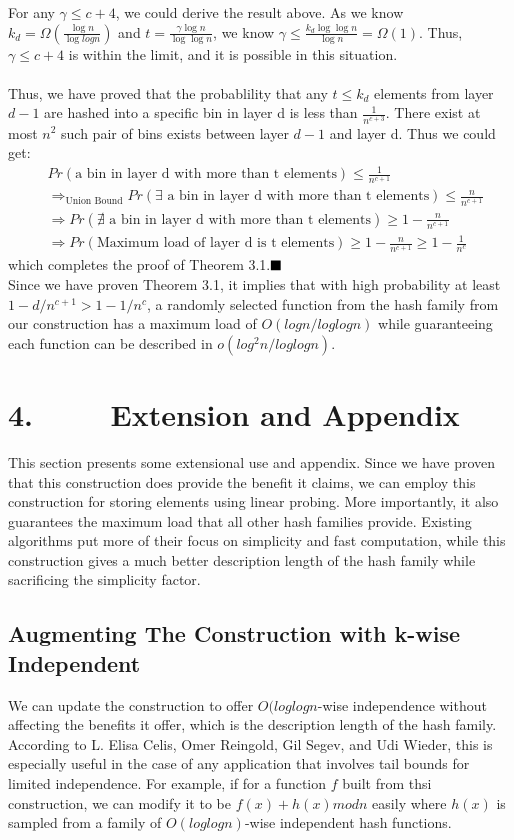 \documentclass[a4paper, english]{paper}
\begin{document}
For any $\gamma\le c+4$, we could derive the result above. As we know $k_d = \Omega(\frac{\log n}{\log log n})$ and $t = \frac{\gamma\log n}{\log\log n}$, we know $\gamma\le \frac{k_d\log\log n}{\log n} = \Omega(1)$. Thus, $\gamma\le c+4$ is within the limit, and it is possible in this situation.\\\\
Thus, we have proved that the probablility that any $t\le k_d$ elements from layer $d-1$ are hashed into a specific bin in layer d is less than $\frac{1}{n^{c+3}}$. There exist at most $n^2$ such pair of bins exists between layer $d-1$ and layer d. Thus we could get:
\begin{align*}
&Pr(\text{a bin in layer d with more than t elements})\le\frac1{n^{c+1}}\\
&\Rightarrow_{\text{Union Bound}} Pr(\exists\text{ a bin in layer d with more than t elements})\le\frac n{n^{c+1}}\\
&\Rightarrow Pr(\nexists\text{ a bin in layer d with more than t elements})\ge 1-\frac n{n^{c+1}}\\
&\Rightarrow Pr(\text{Maximum load of layer d is t elements})\ge 1-\frac n{n^{c+1}}\ge 1-\frac1{n^c}
\end{align*}
which completes the proof of Theorem 3.1.$\hfill\blacksquare$ \\

Since we have proven Theorem 3.1, it implies that with high probability at least $1-d/n^{c+1} > 1-1/n^c$, a randomly selected function from the hash family from our construction has a maximum load of $O(logn/loglogn)$ while guaranteeing each function can be described in $o(log^2 n/loglogn)$. 


	 \section{4. $\qquad$ Extension and Appendix}
	 This section presents some extensional use and appendix. Since we have proven that this construction does provide the benefit it claims, we can employ this construction for storing elements using linear probing. More importantly, it also guarantees the maximum load that all other hash families provide. Existing algorithms put more of their focus on simplicity and fast computation, while this construction gives a much better description length of the hash family while sacrificing the simplicity factor.
	 
	 \subsection{Augmenting The Construction with k-wise Independent} 
	 We can update the construction to offer $O(loglogn$-wise independence without affecting the benefits it offer, which is the description length of the hash family. According to L. Elisa Celis, Omer Reingold, Gil Segev, and Udi Wieder, this is especially useful in the case of any application that involves tail bounds for limited independence. For example, if for a function $f$ built from thsi construction, we can modify it to be $f(x)+h(x)modn$ easily where $h(x)$ is sampled from a family of $O(loglogn)$-wise independent hash functions. 
	 
\end{document}
